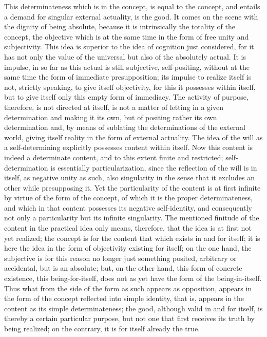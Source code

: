 This determinateness which is in the concept,
is equal to the concept,
and entails a demand for singular external actuality,
is the good.
It comes on the scene with the dignity of being absolute,
because it is intrinsically the totality of the concept,
the objective which is at the same time
in the form of free unity and subjectivity.
This idea is superior to the idea of cognition just considered,
for it has not only the value of the universal
but also of the absolutely actual.
It is impulse, in so far as this actual is still subjective,
self-positing, without at the same time
the form of immediate presupposition;
its impulse to realize itself is not, strictly speaking,
to give itself objectivity,
for this it possesses within itself,
but to give itself only this
empty form of immediacy.
The activity of purpose, therefore, is
not directed at itself,
is not a matter of letting in a given determination
and making it its own,
but of positing rather its own determination
and, by means of sublating
the determinations of the external world,
giving itself reality in the form of external actuality.
The idea of the will as a self-determining
explicitly possesses content within itself.
Now this content is indeed a determinate content,
and to this extent finite and restricted;
self-determination is essentially particularization,
since the reflection of the will is in itself,
as negative unity as such,
also singularity in the sense that
it excludes an other while presupposing it.
Yet the particularity of the content is
at first infinite by virtue of the form of the concept,
of which it is the proper determinateness,
and which in that content
possesses its negative self-identity,
and consequently not only a particularity
but its infinite singularity.
The mentioned finitude of the content
in the practical idea only means, therefore,
that the idea is at first not yet realized;
the concept is for the content
that which exists in and for itself;
it is here the idea in the form of
objectivity existing for itself;
on the one hand, the subjective is
for this reason no longer just something posited,
arbitrary or accidental,
but is an absolute;
but, on the other hand,
this form of concrete existence,
this being-for-itself,
does not as yet have the form of
the being-in-itself.
Thus what from the side of
the form as such appears as opposition,
appears in the form of the concept
reflected into simple identity, that is,
appears in the content as its simple determinateness;
the good, although valid in and for itself,
is thereby a certain particular purpose,
but not one that first receives its truth by being realized;
on the contrary, it is for itself already the true.

